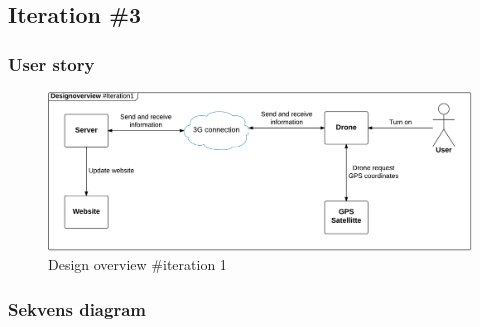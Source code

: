 \subsection{Iteration \#3}


\subsubsection*{User story}


\begin{figure}[H]
	\centering
	\includegraphics[width=1\textwidth]{Billeder/design_overview/design_overview_iteration1.png}
	\vspace{-.5cm}
	\caption{Design overview \#iteration 1}
	\label{fig:design_overview_UC1}
\end{figure}


\newpage
\subsubsection*{Sekvens diagram}



